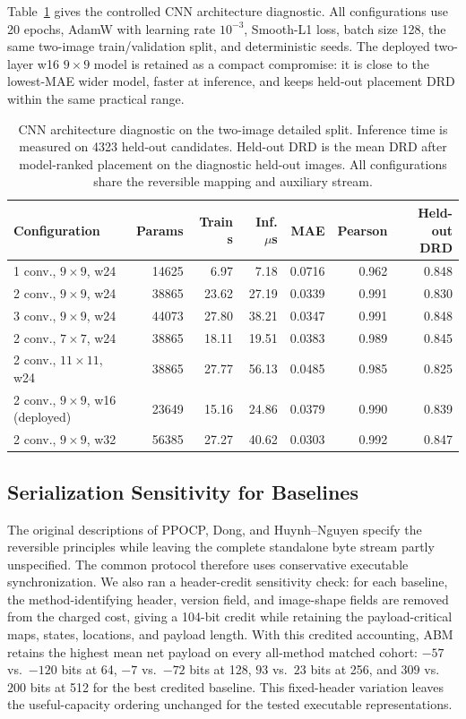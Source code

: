 Table~\ref{tab:cnn-architecture-ablation} gives the controlled CNN
architecture diagnostic. All configurations use 20 epochs, AdamW with learning
rate $10^{-3}$, Smooth-L1 loss, batch size 128, the same two-image
train/validation split, and deterministic seeds. The deployed two-layer
w16 $9\times9$ model is retained as a compact compromise: it is close to the
lowest-MAE wider model, faster at inference, and keeps held-out placement DRD
within the same practical range.

\begin{table}[t]
\centering
\caption{CNN architecture diagnostic on the two-image detailed split. Inference
time is measured on 4323 held-out candidates. Held-out DRD is the mean DRD
after model-ranked placement on the diagnostic held-out images. All
configurations share the reversible mapping and auxiliary stream.}
\label{tab:cnn-architecture-ablation}
\begin{tabular*}{\textwidth}{@{\extracolsep{\fill}}lrrrrrr@{}}
\toprule
\textbf{Configuration} & \textbf{Params} & \textbf{Train s} &
\textbf{Inf. $\mu$s} & \textbf{MAE} & \textbf{Pearson} &
\textbf{Held-out DRD} \\
\midrule
1 conv., $9\times9$, w24 & 14625 & 6.97 & 7.18 & 0.0716 & 0.962 & 0.848 \\
2 conv., $9\times9$, w24 & 38865 & 23.62 & 27.19 & 0.0339 & 0.991 & 0.830 \\
3 conv., $9\times9$, w24 & 44073 & 27.80 & 38.21 & 0.0347 & 0.991 & 0.848 \\
2 conv., $7\times7$, w24 & 38865 & 18.11 & 19.51 & 0.0383 & 0.989 & 0.845 \\
2 conv., $11\times11$, w24 & 38865 & 27.77 & 56.13 & 0.0485 & 0.985 & 0.825 \\
2 conv., $9\times9$, w16 (deployed) & 23649 & 15.16 & 24.86 & 0.0379 & 0.990 & 0.839 \\
2 conv., $9\times9$, w32 & 56385 & 27.27 & 40.62 & 0.0303 & 0.992 & 0.847 \\
\bottomrule
\end{tabular*}
\end{table}

\subsection{Serialization Sensitivity for Baselines}

The original descriptions of PPOCP, Dong, and Huynh--Nguyen specify the
reversible principles while leaving the complete standalone byte stream partly
unspecified. The common protocol therefore uses conservative executable
synchronization. We also ran a header-credit sensitivity check: for each
baseline, the method-identifying header, version field, and image-shape fields
are removed from the charged cost, giving a 104-bit credit while retaining the
payload-critical maps, states, locations, and payload length. With this
credited accounting, ABM retains the highest mean net payload on every
all-method matched cohort: $-57$ vs.\ $-120$ bits at 64, $-7$ vs.\ $-72$ bits
at 128, $93$ vs.\ $23$ bits at 256, and $309$ vs.\ $200$ bits at 512 for the
best credited baseline. This fixed-header variation leaves the useful-capacity
ordering unchanged for the tested executable representations.

